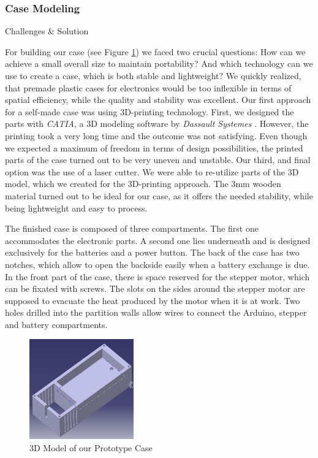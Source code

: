 \documentclass{sigchi}
\begin{document}
\subsubsection{Case Modeling}
Challenges \& Solution

For building our case (see Figure \ref{fig:Case}) we faced two crucial questions: How can we achieve a small overall size to maintain portability? And which technology can we use to create a case, which is both stable and lightweight? 
We quickly realized, that premade plastic cases for electronics would be too inflexible in terms of spatial efficiency, while the quality and stability was excellent. Our first approach for a self-made case was using 3D-printing technology. First, we designed the parts with \textit{CATIA}, a 3D modeling software by \textit{Dassault Systemes} \cite{dassault}. However, the printing took a very long time and the outcome was not satisfying. Even though we expected a maximum of freedom in terms of design possibilities, the printed parts of the case turned out to be very uneven and unstable. 
Our third, and final option was the use of a laser cutter. We were able to re-utilize parts of the 3D model, which we created for the 3D-printing approach. The 3mm wooden material turned out to be ideal for our case, as it offers the needed stability, while being lightweight and easy to process. 

The finished case is composed of three compartments. The first one accommodates the electronic parts. 
A second one lies underneath and is designed exclusively for the batteries and a power button. The back of the case has two notches, which allow to open the backside easily when a battery exchange is due. In the front part of the case, there is space reserved for the stepper motor, which can be fixated with screws. The slots on the sides around the stepper motor are supposed to evacuate the heat produced by the motor when it is at work. Two holes drilled into the partition walls allow wires to connect the Arduino, stepper and battery compartments.

\begin{figure}
 	\center
 	\includegraphics[width=0.4\textwidth]{case.png}
	\caption{3D Model of our Prototype Case}
	\label{fig:Case}
\end{figure} 
\end{document}

